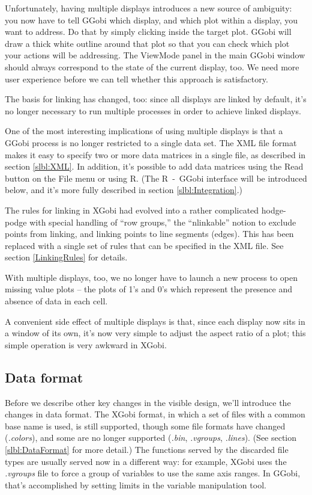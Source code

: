 \documentclass[11pt]{article}
\begin{document}
Unfortunately, having multiple displays introduces a new source of
ambiguity: you now have to tell GGobi which display, and which plot
within a display, you want to address.  Do that by simply clicking
inside the target plot.  GGobi will draw a thick white outline around
that plot so that you can check which plot your actions will be
addressing.  The ViewMode panel in the main GGobi window should
always correspond to the state of the current display, too.  We need
more user experience before we can tell whether this approach is
satisfactory.

The basis for linking has changed, too:  since all displays are
linked by default, it's no longer necessary to run multiple processes
in order to achieve linked displays.

One of the most interesting implications of using multiple displays
is that a GGobi process is no longer restricted to a single data
set.  The XML file format makes it easy to specify two or more data
matrices in a single file, as described in section \ref{slbl:XML}.
In addition, it's possible to add data matrices using the Read button
on the File menu or using R.  (The R~-~GGobi interface will be
introduced below, and it's more fully described in section
\ref{slbl:Integration}.)

The rules for linking in XGobi had evolved into a rather complicated
hodge-podge with special handling of ``row groups,'' the
``nlinkable'' notion to exclude points from linking, and linking
points to line segments (edges).  This has been replaced with a single set
of rules that can be specified in the XML file.  See section 
\ref{LinkingRules} for details.

With multiple displays, too, we no longer have to launch a new
process to open missing value plots -- the plots of 1's and 0's
which represent the presence and absence of data in each cell.

A convenient side effect of multiple displays is that, since each
display now sits in a window of its own, it's now very simple to
adjust the aspect ratio of a plot; this simple operation is very
awkward in XGobi.

\subsection {Data format}

Before we describe other key changes in the visible design, we'll
introduce the changes in data format.  The XGobi format, in which a
set of files with a common base name is used, is still supported,
though some file formats have changed ({\em .colors}), and some are no
longer supported ({\em .bin}, {\em .vgroups}, {\em .lines}).  (See
section \ref{slbl:DataFormat} for more detail.) The functions served
by the discarded file types are usually served now in a different
way:  for example, XGobi uses the {\em .vgroups} file to force
a group of variables to use the same axis ranges.  In GGobi, that's
accomplished by setting limits in the variable manipulation tool.
\end{document}
